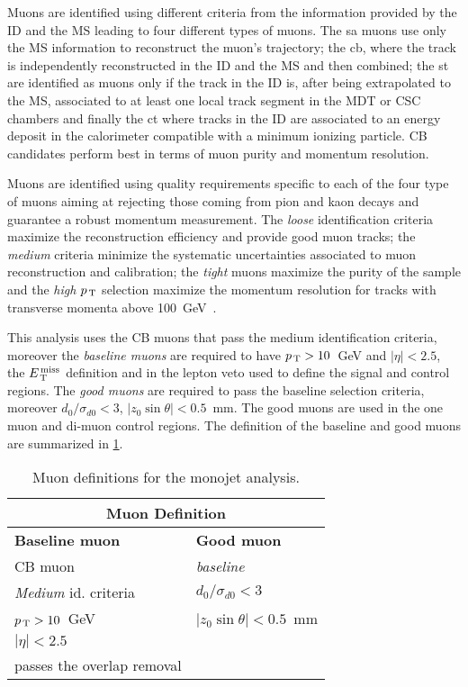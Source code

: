 Muons are identified using different criteria from the information provided by
the ID and the MS leading to four different types of muons. The \gls{sa} muons
use only the MS information to reconstruct the muon's trajectory; the \gls{cb},
where the track is independently reconstructed in the ID and the MS and then
combined; the \gls{st} are identified as muons only if the track in the ID is,
after being extrapolated to the MS, associated to at least one local track
segment in the MDT or CSC chambers and finally the \gls{ct} where tracks in the
ID are associated to an energy deposit in the calorimeter compatible with a
minimum ionizing particle. CB candidates perform best in terms of muon purity
and momentum resolution.

Muons are identified using quality requirements specific to each of the four
type of muons aiming at rejecting those coming from pion and kaon decays and
guarantee a robust momentum measurement. The \emph{loose} identification
criteria maximize the reconstruction efficiency and provide good muon tracks;
the \emph{medium} criteria minimize the systematic uncertainties associated to
muon reconstruction and calibration; the \emph{tight} muons maximize the purity
of the sample and the \emph{high $p_\mathrm{\, T}$} selection maximize the momentum
resolution for tracks with transverse momenta above 100~GeV~\cite{MUONS}.

This analysis uses the CB muons that pass the medium identification criteria,
moreover the \emph{baseline muons} are required to have $p_\mathrm{\, T} > 10$~GeV and
$|\eta| < 2.5$, the $E_\mathrm{\, T}^\mathrm{\, miss}$ definition and in the lepton veto used to define the
signal and control regions. The \emph{good muons} are required to pass the
baseline selection criteria, moreover $d_0 / \sigma_{d0} < 3$,
$|z_0 \sin \theta| < 0.5$~mm. The good muons are used in the one muon and
di-muon control regions. The definition of the baseline and good muons are
summarized in \cref{tab:mu_def}.
\begin{table}[!th]
  \centering
  \begin{tabular}{ll}
    \toprule
    \multicolumn{2}{c}{Muon Definition} \\
    \midrule \midrule
    \textbf{Baseline muon} & \textbf{Good muon} \\
    \midrule
    CB muon & \emph{baseline} \\
    \emph{Medium} id. criteria & $d_0 / \sigma_{d0} < 3$ \\
    $p_\mathrm{\, T} > 10$~GeV & $|z_0 \sin \theta| < 0.5$~mm \\
    $|\eta| < 2.5$ & \\
    passes the overlap removal & \\
    \bottomrule
  \end{tabular}
  \caption{Muon definitions for the monojet analysis.}
  \label{tab:mu_def}
\end{table}
